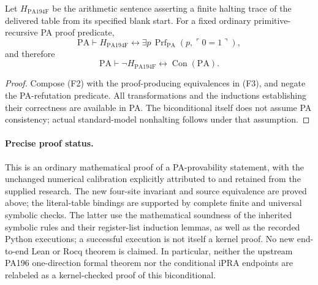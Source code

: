 \begin{theorem}
Let $H_{\mathrm{PA194F}}$ be the arithmetic sentence asserting a finite
halting trace of the delivered table from its specified blank start.
For a fixed ordinary primitive-recursive PA proof predicate,
\[
 \mathrm{PA}\vdash H_{\mathrm{PA194F}}\leftrightarrow
    \exists p\,\operatorname{Prf}_{\mathrm{PA}}
                      (p,\ulcorner0=1\urcorner),
\]
and therefore
\[
 \mathrm{PA}\vdash
       \neg H_{\mathrm{PA194F}}\leftrightarrow\operatorname{Con}(\mathrm{PA}).
\]
\end{theorem}
\begin{proof}
Compose (F2) with the proof-producing equivalences in (F3), and negate
the PA-refutation predicate. All transformations and the inductions
establishing their correctness are available in PA. The biconditional
itself does not assume PA consistency; actual standard-model nonhalting
follows under that assumption.
\end{proof}

\paragraph{Precise proof status.}
This is an ordinary mathematical proof of a PA-provability statement,
with the unchanged numerical calibration explicitly attributed to and
retained from the supplied research. The new four-site invariant and
source equivalence are proved above; the literal-table bindings are
supported by complete finite and universal symbolic checks. The latter
use the mathematical soundness of the inherited symbolic rules and
their register-list induction lemmas, as well as the recorded Python
executions; a successful execution is not itself a kernel proof. No new
end-to-end Lean or Rocq theorem is claimed. In particular, neither the
upstream PA196 one-direction formal theorem nor the conditional iPRA
endpoints are relabeled as a kernel-checked proof of this biconditional.
